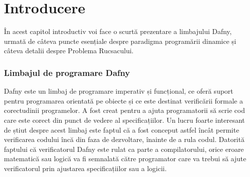 \chapter*{Introducere} 

\begin{sloppypar}
În acest capitol introductiv voi face o scurtă prezentare a limbajului Dafny, urmată de câteva puncte esențiale despre paradigma programării dinamice și câteva detalii despre Problema Rucsacului.

\subsection*{Limbajul de programare Dafny}
Dafny este un limbaj de programare imperativ și funcțional, ce oferă suport pentru programarea orientată pe obiecte și ce este destinat verificării formale a corectudinii programelor. \cite{enwiki:1265861302} A fost creat pentru a ajuta programatorii să scrie cod care este corect din punct de vedere al specificațiilor. Un lucru foarte interesant de știut despre acest limbaj este faptul că a fost conceput astfel încât permite verificarea codului încă din faza de dezvoltare, înainte de a rula codul. Datorită faptului că verificatorul Dafny este rulat ca parte a compilatorului, orice eroare matematică sau logică va fi semnalată către programator care va trebui să ajute verificatorul prin ajustarea specificațiilor sau a logicii. \cite{leino2021dafny}


\end{sloppypar}
